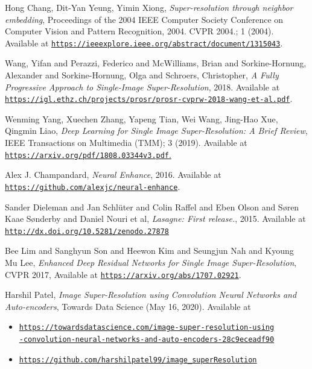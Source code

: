 \documentclass[letterpaper,12pt]{article}
\begin{document}
\pagebreak
\begin{thebibliography}{10}

 Hong Chang, Dit-Yan Yeung, Yimin Xiong,
\emph{Super-resolution through neighbor embedding},
Proceedings of the 2004 IEEE Computer Society Conference on Computer Vision and Pattern Recognition, 2004. CVPR 2004.; 1 (2004).
Available at \href{https://ieeexplore.ieee.org/abstract/document/1315043}{\texttt{https://ieeexplore.ieee.org/abstract/document/1315043}}.

 Wang, Yifan and Perazzi, Federico and McWilliams, Brian and Sorkine-Hornung, Alexander and Sorkine-Hornung, Olga and Schroers, Christopher, 
\emph{A Fully Progressive Approach to Single-Image Super-Resolution}, 2018.
Available at \href{https://igl.ethz.ch/projects/prosr/prosr-cvprw-2018-wang-et-al.pdf}{\texttt{https://igl.ethz.ch/projects/prosr/prosr-cvprw-2018-wang-et-al.pdf}}.

 Wenming Yang, Xuechen Zhang, Yapeng Tian, Wei Wang, Jing-Hao Xue, Qingmin Liao,
\emph{Deep Learning for Single Image Super-Resolution: A Brief Review},
IEEE Transactions on Multimedia (TMM); 3 (2019).
Available at \href{https://arxiv.org/pdf/1808.03344v3.pdf}{\texttt{https://arxiv.org/pdf/1808.03344v3.pdf}.}

 Alex J. Champandard, 
\emph{Neural Enhance}, 2016.
Available at \href{https://github.com/alexjc/neural-enhance}{\texttt{https://github.com/alexjc/neural-enhance}}.

 Sander Dieleman and
                  Jan Schlüter and
                  Colin Raffel and
                  Eben Olson and
                  Søren Kaae Sønderby and
                  Daniel Nouri
                  et al,
\emph{Lasagne: First release.}, 2015.
Available at \href{http://dx.doi.org/10.5281/zenodo.27878}{\texttt{http://dx.doi.org/10.5281/zenodo.27878}}

 Bee Lim and Sanghyun Son and Heewon Kim and Seungjun Nah and Kyoung Mu Lee,
\emph{Enhanced Deep Residual Networks for Single Image Super-Resolution},
CVPR 2017,
Available at \href{https://arxiv.org/abs/1707.02921}{\texttt{https://arxiv.org/abs/1707.02921}}.

 Harshil Patel,
\emph{Image Super-Resolution using Convolution Neural Networks and Auto-encoders},
Towards Data Science (May 16, 2020).
Available at 

\begin{itemize}
    \item \href{https://towardsdatascience.com/image-super-resolution-using-convolution-neural-networks-and-auto-encoders-28c9eceadf90}{\texttt{https://towardsdatascience.com/image-super-resolution-using\\-convolution-neural-networks-and-auto-encoders-28c9eceadf90}}
    \item \href{https://github.com/harshilpatel99/image_superResolution}{\texttt{https://github.com/harshilpatel99/image\_superResolution}}
\end{itemize}



\end{thebibliography}
\end{document}

